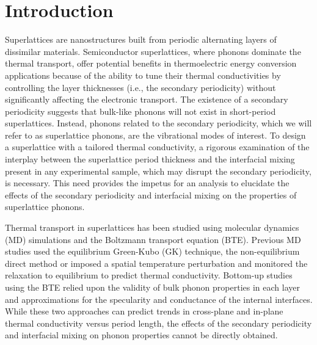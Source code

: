 \documentclass[aps,prb,preprint,preprintnumbers,amsmath,amssymb,floatfix,superscriptaddress]{revtex4}
\begin{document}
\section{Introduction}

Superlattices are nanostructures built from periodic alternating layers of dissimilar materials. {\color{red}Semiconductor superlattices, where phonons dominate the thermal transport, offer potential benefits in thermoelectric energy conversion applications because of the ability to tune their thermal conductivities by controlling the layer thicknesses (i.e., the secondary periodicity) without significantly affecting the electronic transport.\cite{yao1987thermal,broido1995effect,PhysRevB.59.8105,balandin2003mechanism,kim2006thermal}} The existence of a secondary periodicity suggests that bulk-like phonons will not exist in short-period superlattices. Instead, phonons related to the secondary periodicity, which we will refer to as superlattice phonons, are the vibrational modes of interest. To design a superlattice with a tailored thermal conductivity, a rigorous examination of the interplay between the superlattice period thickness and the interfacial mixing present in any experimental sample, which may disrupt the secondary periodicity, is necessary. This need provides the impetus for an analysis to elucidate the effects of the secondary periodicity and interfacial mixing on the properties of superlattice phonons. 

Thermal transport in superlattices has been studied using molecular dynamics (MD) simulations and the Boltzmann transport equation (BTE). Previous MD studies used the equilibrium Green-Kubo (GK) \cite {PhysRevB.77.184302} technique, the non-equilibrium direct method \cite{Imamura2003Lattice,PhysRevB.77.184302,PhysRevB.79.214307,PhysRevB.72.174302,PhysRevB.79.075316} {\color{red}or imposed a spatial temperature perturbation and monitored the relaxation to equilibrium \cite{PhysRevB.66.024301,PhysRevB.67.033308} to predict thermal conductivity.}  Bottom-up studies using the BTE relied upon the validity of bulk phonon properties in each layer\cite{walkauskas:2579,chen:220} and approximations for the specularity and conductance of the internal interfaces.\cite{PhysRevB.57.14958} While these two approaches can predict trends in cross-plane and in-plane thermal conductivity versus period length, the effects of the secondary periodicity and interfacial mixing on phonon properties cannot be directly obtained.
\end{document}
